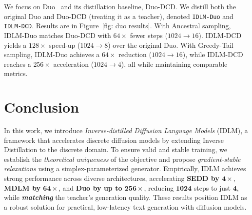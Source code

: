   We focus on Duo~\citep{sahoo2025the} and its distillation baseline, Duo-DCD. We distill both the original Duo and
Duo-DCD (treating it as a teacher), denoted \texttt{IDLM-Duo} and \texttt{IDLM-DCD}. Results are in Figure~\ref{fig: duo results}.
With Ancestral sampling, IDLM-Duo matches Duo-DCD with $64\times$ fewer steps ($1024 \to 16$).
IDLM-DCD yields a $128\times$ speed-up ($1024 \to 8$) over the original Duo. With Greedy-Tail sampling,
IDLM-Duo achieves a $64\times$ reduction ($1024 \to 16$), while IDLM-DCD reaches a $256\times$ acceleration ($1024 \to 4$),
all while maintaining comparable metrics.
\vspace{-2mm}
\section{Conclusion}
\vspace{-2mm}
\label{sec:conclusion}
In this work, we introduce \emph{Inverse-distilled Diffusion Language Models} (IDLM), a framework that accelerates
discrete diffusion models by extending Inverse Distillation to the discrete domain.
To ensure valid and stable training, we establish the \emph{theoretical uniqueness} of the objective and propose
\emph{gradient-stable relaxations} using a simplex-parameterized generator.
Empirically, IDLM achieves strong performance across diverse architectures, accelerating \textbf{SEDD by
  $\mathbf{4\times}$},
\textbf{MDLM by $\mathbf{64\times}$}, and \textbf{Duo by up to $\mathbf{256\times}$}, reducing $\mathbf{1024}$ steps to
just $\mathbf{4}$,
while \textit{\textbf{matching}} the teacher's generation quality.
These results position IDLM as a robust solution for practical, low-latency text generation with diffusion models.






